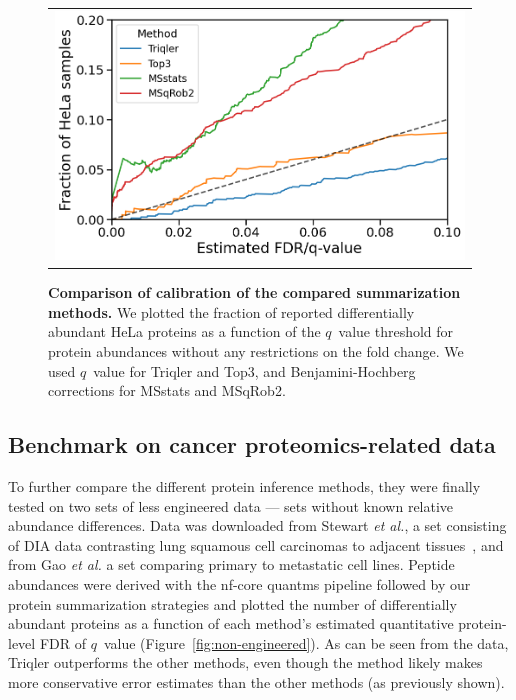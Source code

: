 \documentclass[10pt,letterpaper]{article}
\begin{document}
\begin{figure}[hbt]
    \centering
    \begin{tabular}{c} 
        \includegraphics[width=0.5\linewidth]{./img/calibration_ID_0.png}
    \end{tabular}
  \caption{{\bf Comparison of calibration of the compared summarization methods.} We plotted the fraction of reported differentially abundant HeLa proteins as a function of the $q$~value threshold for protein abundances without any restrictions on the fold change. We used $q$~value for Triqler and Top3, and Benjamini-Hochberg corrections for MSstats and MSqRob2. \label{fig:frac_hela_vs_fdr}}
\end{figure}


\subsection*{Benchmark on cancer proteomics-related data}

To further compare the different protein inference methods, they were finally tested on two sets of less engineered data --- sets without known relative abundance differences.  Data was downloaded from Stewart {\em et al.}, a set consisting of DIA data contrasting lung squamous cell carcinomas to adjacent tissues~\cite{stewart2017relative}, and from Gao {\em et al.} a set comparing primary to metastatic cell lines\cite{gao2021data}. Peptide abundances were derived with the nf-core quantms pipeline followed by our protein summarization strategies and plotted the number of differentially abundant proteins as a function of each method's estimated quantitative protein-level FDR of $q$~value (Figure~\ref{fig:non-engineered}). As can be seen from the data, Triqler outperforms the other methods, even though the method likely makes more conservative error estimates than the other methods (as previously shown).
\end{document}
